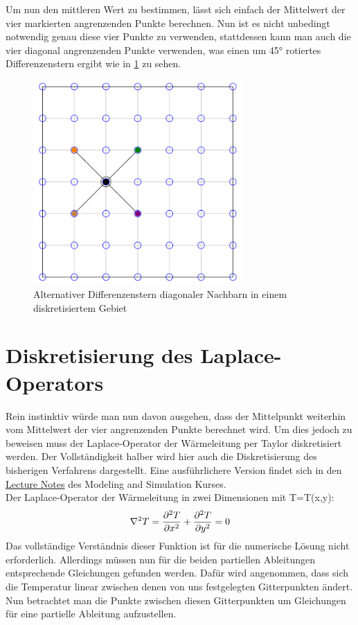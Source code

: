 \documentclass[twoside,10pt,a4paper]{article}
\numberwithin{equation}{section}					%
\numberwithin{figure}{section}						%
\begin{document}
Um nun den mittleren Wert zu bestimmen, lässt sich einfach der Mittelwert der vier markierten angrenzenden Punkte berechnen.
Nun ist es nicht unbedingt notwendig genau diese vier Punkte zu verwenden, stattdessen kann man auch die vier diagonal angrenzenden Punkte verwenden, was einen um 45° rotiertes Differenzenstern ergibt wie in \ref{fig:2} zu sehen.

    \begin{figure}[h]
        \centering
        \includegraphics[width=8cm]{bilder/Picture3.png}
        \caption{Alternativer Differenzenstern diagonaler Nachbarn in einem diskretisiertem Gebiet}
        \label{fig:2}
    \end{figure}


\section{Diskretisierung des Laplace-Operators}
Rein instinktiv würde man nun davon ausgehen, dass der Mittelpunkt weiterhin vom Mittelwert der vier angrenzenden Punkte berechnet wird. Um dies jedoch zu beweisen muss der Laplace-Operator der Wärmeleitung per Taylor diskretisiert werden.
Der Vollständigkeit halber wird hier auch die Diskretisierung des bisherigen Verfahrens dargestellt. Eine ausführlichere Version findet sich in den \href{https://ilias.hs-heilbronn.de/goto.php?target=file_137931_download&client_id=iliashhn}{Lecture Notes} des Modeling and Simulation Kurses.\\
Der Laplace-Operator der Wärmeleitung in zwei Dimensionen mit T=T(x,y):
\begin{equation}\label{laplace}
\\
    \nabla ^2 T=\frac{\partial^2 T}{\partial x^2}+\frac{\partial^2 T}{\partial y^2}=0
\\
\end{equation}
Das vollständige Verständnis dieser Funktion ist für die numerische Lösung nicht erforderlich. Allerdings müssen nun für die beiden partiellen Ableitungen entsprechende Gleichungen gefunden werden. Dafür wird angenommen, dass sich die Temperatur linear zwischen denen von uns festgelegten Gitterpunkten ändert. Nun betrachtet man die Punkte zwischen diesen Gitterpunkten um Gleichungen für eine partielle Ableitung aufzustellen.
\\
\end{document}
